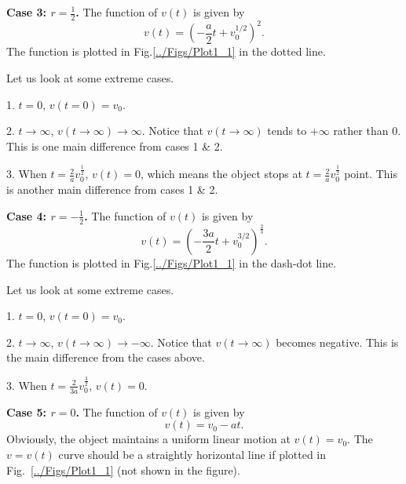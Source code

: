  \begin{subsubsection}
  {\textbf{Case 3: $r=\frac{1}{2}$.}} The function of $v(t)$ is given by
   \begin{equation}
     v(t)=\left( -\frac{a}{2}t+v_0^{1/2}\right)^2.
   \end{equation}
   The function is plotted in Fig.\ref{../Figs/Plot1_1} in the dotted line.

      Let us look at some extreme cases.

   \begin{list}{}{\leftmargin=1cm}
   \item[1.] $t=0$, $v(t=0)=v_0$.
   \item[2.] $t\rightarrow \infty$, $v(t\rightarrow \infty) \rightarrow \infty$. Notice that $v(t\rightarrow \infty)$ tends to $+\infty$ rather than $0$. This is one main difference from cases 1 \& 2.
   \item[3.] When $t=\frac{2}{a}v_0^{\frac{1}{2}}$, $v(t)=0$, which means the object stops at $t=\frac{2}{a}v_0^{\frac{1}{2}}$ point. This is another main difference from cases 1 \& 2.
   \end{list}
  \end{subsubsection}

  \begin{subsubsection}
    {\textbf{Case 4: $r=-\frac{1}{2}$.}} The function of $v(t)$ is given by
   \begin{equation}
     v(t)=\left( -\frac{3a}{2}t+v_0^{3/2}\right)^{\frac{2}{3}}.
   \end{equation}
   The function is plotted in Fig.\ref{../Figs/Plot1_1} in the dash-dot line.

      Let us look at some extreme cases.

   \begin{list}{}{\leftmargin=1cm}
   \item[1.] $t=0$, $v(t=0)=v_0$.
   \item[2.] $t\rightarrow \infty$, $v(t\rightarrow \infty) \rightarrow -\infty$. Notice that $v(t\rightarrow \infty)$ becomes negative. This is the main difference from the cases above.
   \item[3.] When $t=\frac{2}{3a}v_0^{\frac{3}{2}}$, $v(t)=0$.
   \end{list}
 \end{subsubsection}

 \begin{subsubsection}
    {\textbf{Case 5: $r=0$.}} The function of $v(t)$ is given by
   \begin{equation}
     v(t)= v_0 -at .
   \end{equation}
   Obviously, the object maintains a uniform linear motion at $v(t)=v_0$. The $v=v(t)$ curve should be a straightly horizontal line if plotted in Fig.~\ref{../Figs/Plot1_1} (not shown in the figure).
 \end{subsubsection}

